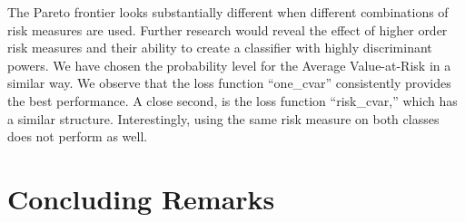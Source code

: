 \documentclass[10pt,letterpaper]{article}
\newcommand{\1}{1{\hskip -2.55 pt}\hbox{I}}
\begin{document}


The Pareto frontier looks substantially different when different combinations of risk measures are used. 
Further research would reveal the effect of higher order risk measures and their ability to create a classifier with highly discriminant powers.
We have chosen the probability level for the Average Value-at-Risk in a similar way.
We observe that the loss function ``one\_cvar'' consistently provides the best performance. 
A close second, is the loss function ``risk\_cvar,'' which has a similar structure.
Interestingly, using the same risk measure on both classes does not perform as well.








\section{Concluding Remarks} %
\label{sec:concluding_remarks}
\end{document}
